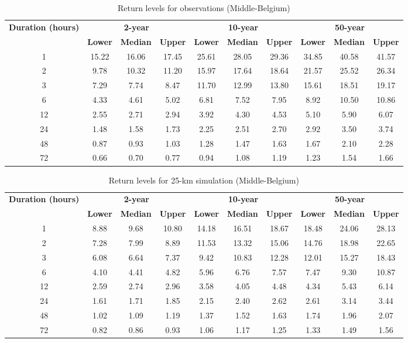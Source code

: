 \begin{table}[p]
\centering
\caption{Return levels for observations (Middle-Belgium)}
\label{tab:observations}
\begin{tabular}{c||ccc||ccc||ccc}
\hline
\textbf{Duration (hours)} & \multicolumn{3}{c||}{\textbf{2-year}} & \multicolumn{3}{c||}{\textbf{10-year}} & \multicolumn{3}{c}{\textbf{50-year}} \\
\cline{2-10}
& \textbf{Lower} & \textbf{Median} & \textbf{Upper} & \textbf{Lower} & \textbf{Median} & \textbf{Upper} & \textbf{Lower} & \textbf{Median} & \textbf{Upper} \\
\hline
1 & 15.22 & 16.06 & 17.45 & 25.61 & 28.05 & 29.36 & 34.85 & 40.58 & 41.57 \\
2 & 9.78 & 10.32 & 11.20 & 15.97 & 17.64 & 18.64 & 21.57 & 25.52 & 26.34 \\
3 & 7.29 & 7.74 & 8.47 & 11.70 & 12.99 & 13.80 & 15.61 & 18.51 & 19.17 \\
6 & 4.33 & 4.61 & 5.02 & 6.81 & 7.52 & 7.95 & 8.92 & 10.50 & 10.86 \\
12 & 2.55 & 2.71 & 2.94 & 3.92 & 4.30 & 4.53 & 5.10 & 5.90 & 6.07 \\
24 & 1.48 & 1.58 & 1.73 & 2.25 & 2.51 & 2.70 & 2.92 & 3.50 & 3.74 \\
48 & 0.87 & 0.93 & 1.03 & 1.28 & 1.47 & 1.63 & 1.67 & 2.10 & 2.28 \\
72 & 0.66 & 0.70 & 0.77 & 0.94 & 1.08 & 1.19 & 1.23 & 1.54 & 1.66 \\
\hline
\end{tabular}
\end{table}

\begin{table}[p]
\centering
\caption{Return levels for 25-km simulation (Middle-Belgium)}
\label{tab:observations}
\begin{tabular}{c||ccc||ccc||ccc}
\hline
\textbf{Duration (hours)} & \multicolumn{3}{c||}{\textbf{2-year}} & \multicolumn{3}{c||}{\textbf{10-year}} & \multicolumn{3}{c}{\textbf{50-year}} \\
\cline{2-10}
& \textbf{Lower} & \textbf{Median} & \textbf{Upper} & \textbf{Lower} & \textbf{Median} & \textbf{Upper} & \textbf{Lower} & \textbf{Median} & \textbf{Upper} \\
\hline
1 & 8.88 & 9.68 & 10.80 & 14.18 & 16.51 & 18.67 & 18.48 & 24.06 & 28.13 \\
2 & 7.28 & 7.99 & 8.89 & 11.53 & 13.32 & 15.06 & 14.76 & 18.98 & 22.65 \\
3 & 6.08 & 6.64 & 7.37 & 9.42 & 10.83 & 12.28 & 12.01 & 15.27 & 18.43 \\
6 & 4.10 & 4.41 & 4.82 & 5.96 & 6.76 & 7.57 & 7.47 & 9.30 & 10.87 \\
12 & 2.59 & 2.74 & 2.96 & 3.58 & 4.05 & 4.48 & 4.34 & 5.43 & 6.14 \\
24 & 1.61 & 1.71 & 1.85 & 2.15 & 2.40 & 2.62 & 2.61 & 3.14 & 3.44 \\
48 & 1.02 & 1.09 & 1.19 & 1.37 & 1.52 & 1.63 & 1.74 & 1.96 & 2.07 \\
72 & 0.82 & 0.86 & 0.93 & 1.06 & 1.17 & 1.25 & 1.33 & 1.49 & 1.56 \\
\hline
\end{tabular}
\end{table}

